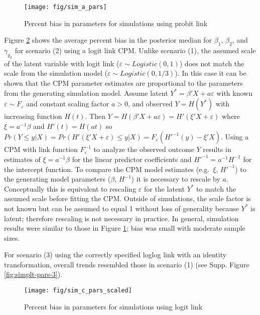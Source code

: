 \documentclass[
]{article}
\begin{document}
\begin{figure}

{\centering \texttt{[image: fig/sim\_a\_pars]} 

}

\caption{Percent bias in parameters for simulations using probit link}\label{fig:simplt-pars-1}
\end{figure}

Figure \ref{fig:simplt-pars-2} shows the average percent bias in the posterior median for \(\beta_1\), \(\beta_2\), and \(\gamma_{y_k}\) for scenario (2) using a logit link CPM. Unlike scenario (1), the assumed scale of the latent variable with logit link (\(\varepsilon \sim Logistic(0,1)\)) does not match the scale from the simulation model (\(\varepsilon \sim Logistic(0,1/3)\)). In this case it can be shown that the CPM parameter estimates are proportional to the parameters from the generating simulation model. Assume latent \(Y^*=\beta'X + a\varepsilon\) with known \(\varepsilon \sim F_{\varepsilon}\) and constant scaling factor \(a>0\), and observed \(Y=H(Y^*)\) with increasing function \(H(t)\). Then \(Y=H(\beta'X+a\varepsilon)=H'(\xi'X+\varepsilon)\) where \(\xi=a^{-1}\beta\) and \(H'(t)=H(at)\) so \(Pr(Y \le y|X)=Pr(H'(\xi'X+\varepsilon)\le y|X)=F_{\varepsilon}(H'^{-1}(y)-\xi'X)\). Using a CPM with link function \(F_{\varepsilon}^{-1}\) to analyze the observed outcome \(Y\) results in estimates of \(\xi=a^{-1}\beta\) for the linear predictor coefficients and \(H'^{-1}=a^{-1}H^{-1}\) for the intercept function. To compare the CPM model estimates (e.g.~\(\xi\), \(H'^{-1}\)) to the generating model parameters (\(\beta\), \(H^{-1}\)) it is necessary to rescale by \(a\). Conceptually this is equivalent to rescaling \(\varepsilon\) for the
latent \(Y^*\) to match the assumed scale before fitting the CPM. Outside of simulations, the scale factor is not known but can be assumed to equal 1 without loss of generality because \(Y^*\) is latent; therefore rescaling is not necessary in practice. In general, simulation results were similar to those in Figure \ref{fig:simplt-pars-1}; bias was small with moderate sample sizes.

For scenario (3) using the correctly specified loglog link with an identity transformation, overall trends resembled those in scenario (1) (see Supp. Figure \ref{fig:simplt-pars-3}).

\begin{figure}

{\centering \texttt{[image: fig/sim\_c\_pars\_scaled]} 

}

\caption{Percent bias in parameters for simulations using logit link}\label{fig:simplt-pars-2}
\end{figure}
\end{document}
